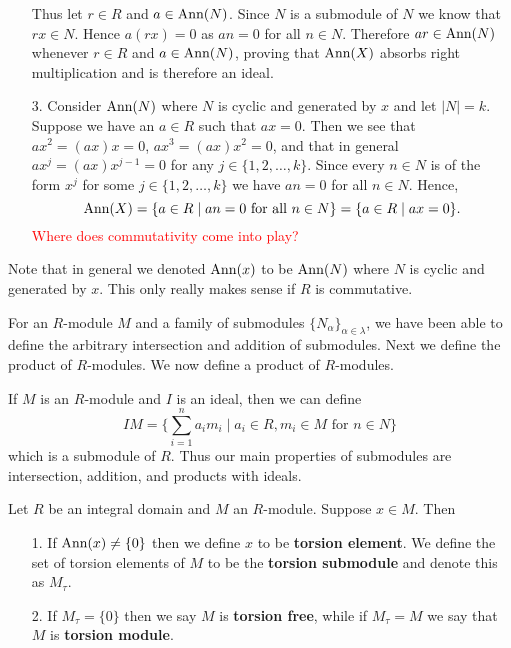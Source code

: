 \begin{prf}
\begin{itemize}
        Thus let $r\in R$ and $a \in \mbox{Ann}(N)$. Since $N$ is a
        submodule of $N$ we know 
        that $rx \in N$. Hence $a(rx) = 0$ as $an = 0$ for all $n
        \in N$. Therefore $ar \in \mbox{Ann}(N)$ whenever $r \in R$ and
        $a \in \mbox{Ann}(N)$, proving that $\mbox{Ann}(X)$ absorbs right
        multiplication and is therefore an ideal.

        \item[3.] Consider $\mbox{Ann}(N)$ where $N$ is cyclic and
        generated by $x$ and let $|N| = k$. Suppose we have an $a \in R$ such that
        $ax = 0$. Then we
        see that $ax^2 = (ax)x = 0$, $ax^3 = (ax)x^2 = 0$, and
        that in general $ax^j = (ax)x^{j-1} = 0$ for any $j \in
        \{1, 2, \dots, k\}$. Since every $n \in N$ is of the form
        $x^j$ for some $j \in \{1, 2, \dots, k\}$ we have $an = 0$
        for all $n \in N$. Hence, 
        \[
            \mbox{Ann}(X) = \{a \in R \mid an = 0 \text{ for all } n \in N\} = \{a \in R \mid ax = 0\}.
        \]
        \textcolor{red}{Where does commutativity come into play?}
    \end{itemize}
\end{prf}  
Note that in general we denoted $\mbox{Ann}(x)$ to be $\mbox{Ann}(N)$ where
$N$ is cyclic and generated by $x$. This only really makes sense
if $R$ is commutative.

For an $R$-module $M$ and a family of submodules
$\{N_\alpha\}_{\alpha \in \lambda}$, we have been able to define
the arbitrary intersection and addition of submodules. Next we
define the product of $R$-modules. We now define a product of
$R$-modules. 

If $M$ is an $R$-module and $I$ is an ideal, then we can define 
\[
    IM = \Big\{ \sum_{i = 1}^{n}a_im_i \mid a_i \in R, m_i \in M \text{ for } n \in N \Big\}    
\]
which is a submodule of $R$. Thus our main properties of
submodules are intersection, addition, and products with ideals. 

\begin{definition}
    Let $R$ be an integral domain and $M$ an $R$-module. Suppose
    $x \in M$. Then
    \begin{itemize}
        \item[1.] If $\mbox{Ann}(x) \ne \{0\}$ then we define $x$ to be
        \textbf{torsion element}. We define the set of torsion
        elements of $M$ to be the \textbf{torsion submodule} and
        denote this as $M_{\tau}$.
        \item[2.] If $M_\tau = \{0\}$ then we say $M$ is
        \textbf{torsion free}, while if $M_\tau = M$ we say that
        $M$ is \textbf{torsion module}.
    \end{itemize}
\end{definition}


